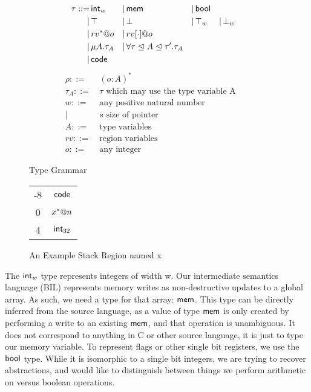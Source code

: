 \begin{figure}[t]
\begin{align*}
\tau ::=&\, \mathsf{int}_{w} &|&\, \mathsf{mem} &|&\, \mathsf{bool} \\
     |&\, \top &|&\, \bot &|&\, \top_{w} &|&\, \bot_{w}\\
     |&\, rv^*@o &|&\, rv[\cdot]@o\\
     |&\, \mu A. \tau_A &|&\, \forall \tau\mathrel{\unlhd} A\mathrel{\unlhd} \tau'.\tau_A\\
     |&\, \mathsf{code}
\end{align*}
\vspace{-2.0\baselineskip}
\begin{align*}
\rho ::=&\, (o : A)^* && \\
\tau_A ::=&\, \tau \textrm{ which may use the type variable A}\\
w ::=&\, \textrm{any positive natural number}\\
    |&\, s \textrm{ size of pointer}\\
A ::=&\, \textrm{type variables}\\
rv ::=&\, \textrm{region variables}\\
o ::=&\, \textrm{any integer}
\end{align*}
\caption{Type Grammar}
\label{fig:tform}
\end{figure}
\begin{figure}
\begin{center}
\begin{tabular}{|c|c|}
\hline
-8 & $\mathsf{code}$\\
0 & $x^*@n$\\
4 & $\mathsf{int}_{32}$\\
\hline
\end{tabular}
\end{center}
\caption{An Example Stack Region named x}
\label{fig:region}
\end{figure}

The $\mathsf{int}_{w}$ type represents integers of width w.
Our intermediate semantics language (BIL) represents memory writes as non-destructive updates to a global array. As such, we need a type for that array: $\mathsf{mem}$. This type can be directly inferred from the source language, as a value of type $\mathsf{mem}$ is only created by performing a write to an existing $\mathsf{mem}$, and that operation is unambiguous. It does not correspond to anything in C or other source language, it is just to type our memory variable.
To represent flags or other single bit registers, we use the $\mathsf{bool}$ type. While it is isomorphic to a single bit integers, we are trying to recover abstractions, and would like to distinguish between things we perform arithmetic on versus boolean operations.

